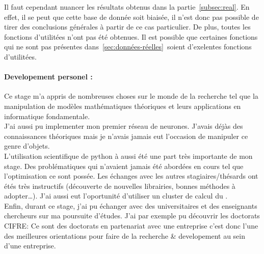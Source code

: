 
Il faut cependant nuancer les résultats obtenus dans la partie\ \ref{subsec:real}.
En effet, il se peut que cette base de donnée soit biaisée,
il n'est donc pas possible de tirer des conclusions générales à partir de ce cas particulier.
De plus, toutes les fonctions d'utilitées n'ont pas été obtenues.
Il est possible que certaines fonctions qui ne sont pas présentes dans\ \ref{sec:données-réelles}\
soient d'exelentes fonctions d'utilitées.


\paragraph{Developement personel :\\}
Ce stage m'a appris de nombreuses choses sur le monde de la recherche tel
que la manipulation de modèles mathématiques théoriques et leurs applications
en informatique fondamentale.\\


J'ai aussi pu implementer mon premier réseau de neurones.
J'avais déjàs des connaissances théoriques mais je
n'avais jamais eut l'occasion de manipuler ce genre d'objets.\\


L'utilisation scientifique de python à aussi été une part très importante de mon stage.
Des problématiques qui n'avaient jamais été abordées en cours tel que l'optimisation ce sont possée.
Les échanges avec les autres stagiaires/thésards ont étés très instructifs
(découverte de nouvelles librairies, bonnes méthodes à adopter\ldots).
J'ai aussi eut l'oportunité d'utiliser un cluster de calcul du \lri.\\


Enfin, durant ce stage, j'ai pu échanger avec des universitaires et des enseignants chercheurs
sur ma poursuite d'études.
J'ai par exemple pu découvrir les doctorats \textsc{CIFRE}\cite{cifre}:
Ce sont des doctorats en partenariat avec une entreprise c'est donc l'une des meilleures
orientations pour faire de la recherche & developement au sein d'une entreprise.

